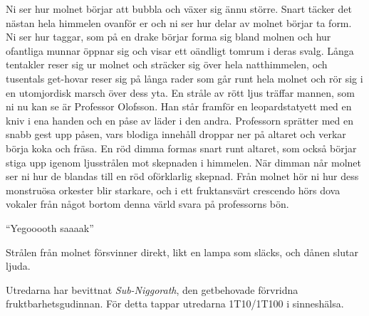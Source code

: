 \begin{displayquote}
	Ni ser hur molnet börjar att bubbla och växer sig ännu större. Snart täcker det nästan hela himmelen ovanför er och ni ser hur delar av molnet börjar ta form. Ni ser hur taggar, som på en drake börjar forma sig bland molnen och hur ofantliga munnar öppnar sig och visar ett oändligt tomrum i deras svalg. Långa tentakler reser sig ur molnet och sträcker sig över hela natthimmelen, och tusentals get-hovar reser sig på långa rader som går runt hela molnet och rör sig i en utomjordisk marsch över dess yta. En stråle av rött ljus träffar mannen, som ni nu kan se är Professor Olofsson. Han står framför en leopardstatyett med en kniv i ena handen och en påse av läder i den andra. Professorn sprätter med en snabb gest upp påsen, vars blodiga innehåll droppar ner på altaret och verkar börja koka och fräsa. En röd dimma formas snart runt altaret, som också börjar stiga upp igenom ljusstrålen mot skepnaden i himmelen. När dimman når molnet ser ni hur de blandas till en röd oförklarlig skepnad. Från molnet hör ni hur dess monstruösa orkester blir starkare, och i ett fruktansvärt crescendo hörs dova vokaler från något bortom denna värld svara på professorns bön.
	\begin{center}
		``Yegooooth saaaak''
	\end{center}
	Strålen från molnet försvinner direkt, likt en lampa som släcks, och dånen slutar ljuda. 
\end{displayquote}
%
Utredarna har bevittnat \textit{Sub-Niggorath}, den getbehovade förvridna fruktbarhetsgudinnan. För detta tappar utredarna 1T10/1T100 i sinneshälsa.
